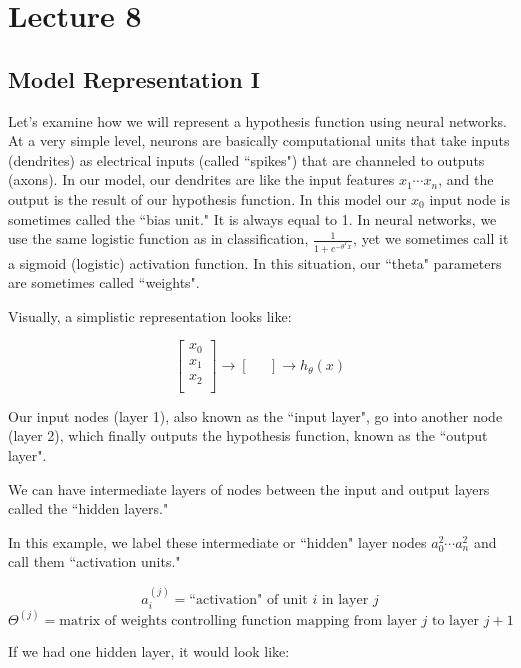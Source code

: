 \documentclass[UTF8]{article}
\begin{document}
\section{Lecture 8}

\subsection{Model Representation I}

Let's examine how we will represent a hypothesis function using neural networks. At a very simple level, neurons are basically computational units that take inputs (dendrites) as electrical inputs (called ``spikes") that are channeled to outputs (axons). In our model, our dendrites are like the input features $x_1\cdots x_n$, and the output is the result of our hypothesis function. In this model our $x_0$ input node is sometimes called the ``bias unit." It is always equal to 1. In neural networks, we use the same logistic function as in classification, $\frac{1}{1 + e^{-\theta^Tx}}$, yet we sometimes call it a sigmoid (logistic) activation function. In this situation, our ``theta" parameters are sometimes called ``weights".

Visually, a simplistic representation looks like:

\[ \begin{bmatrix}x_0 \\ x_1 \\ x_2 \\ \end{bmatrix}\rightarrow\begin{bmatrix}\ \ \ \\ \end{bmatrix}\rightarrow h_\theta(x) \]

Our input nodes (layer 1), also known as the ``input layer", go into another node (layer 2), which finally outputs the hypothesis function, known as the ``output layer".

We can have intermediate layers of nodes between the input and output layers called the ``hidden layers."

In this example, we label these intermediate or ``hidden" layer nodes $a^2_0 \cdots a^2_n$ and call them ``activation units."

\[ a_i^{(j)} = \text{``activation" of unit $i$ in layer $j$} \]
\[ \Theta^{(j)} = \text{matrix of weights controlling function mapping from layer $j$ to layer $j+1$} \]

If we had one hidden layer, it would look like:
\end{document}
